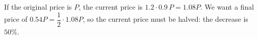 If the original price is $P$, the current price is $1.2\cdot0.9\,P=1.08P$. We want a final price of $0.54P=\dfrac{1}{2}\cdot1.08P$, so the current price must be halved: the decrease is $\boxed{50\%}$.
